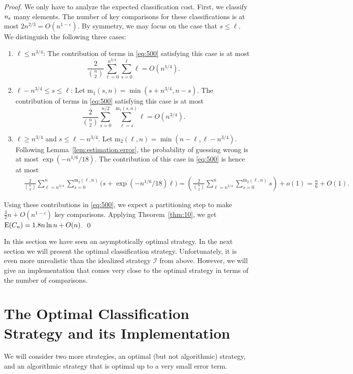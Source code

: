 \documentclass[prodmode,acmtalg]{acmsmall}
\newcommand{\E}{\textnormal{\textrm{E}}}
\newcommand{\Samplesize}{\ensuremath{n_{\textnormal{\textrm{s}}}}}
\begin{document}
\begin{proof}
    We only have to analyze the expected classification cost. First, we classify
    {\Samplesize} many elements. The number of key comparisons for
    these classifications is at most
    $2 n^{2/3} = O(n^{1 - \varepsilon})$. By symmetry, we may focus on the case that $s \leq
    \ell$. We distinguish the following three cases:
    \begin{enumerate}
	\item $\ell \leq n^{3/4}$: The
	    contribution of terms in \eqref{eq:500} satisfying this case is at most
		$$\frac{2}{\binom{n}{2}} \sum_{\ell =
		0}^{n^{3/4}}\sum_{s = 0}^{\ell} \ell = O(n^{1/4}).$$
	\item $\ell - n^{3/4} \leq s \leq \ell$:
            Let $\textrm{m}_1(s, n) = \min(s + n^{3/4}, n - s)$. The contribution
            of terms in \eqref{eq:500} satisfying this case is at most
	     $$\frac{2}{\binom{n}{2}} \sum_{s = 0}^{n/2} \,\, \sum_{\ell
             = s}^{\textrm{m}_1(s, n)} \ell = O(n^{3/4}).$$
     \item $\ell \geq n^{3/4}$ and $s \leq \ell - n^{3/4}$. Let $\textrm{m}_2(\ell, n) =
	 \min(n-\ell, \ell - n^{3/4})$.
	    Following Lemma~\ref{lem:estimation:error}, the probability of
	    guessing wrong is at most $\exp(-n^{1/6}/18)$.
	    The contribution of this case in \eqref{eq:500} is hence at most 
	    \begin{align*}
		&\frac{2}{\binom{n}{2}} \sum_{\ell = n^{3/4}}^{n}\sum_{s =
	    0}^{\textrm{m}_2(\ell, n)} \bigg(s + \exp(-n^{1/6}/18) \ell\bigg) =
	    \left(\frac{2}{\binom{n}{2}} \sum_{\ell = n^{3/4}}^{n}\sum_{s =
	    0}^{\textrm{m}_2(\ell, n)} s\right) + o(1) = \frac{n}{6} + O(1).
	     \end{align*}
    \end{enumerate}
    Using these contributions in \eqref{eq:500}, we
    expect a partitioning step to make $\frac{3}{2}
    n + O(n^{1 - \varepsilon})$ key comparisons. Applying Theorem~\ref{thm:10}, we get
    $\E(C_n) = 1.8 n \ln n + O(n)$. \qed
\end{proof}
In this section we have seen an asymptotically optimal strategy. In the next section we will present the
optimal classification strategy. Unfortunately, it is even more unrealistic than the idealized
strategy $\mathcal{I}$ from above. However, we will give an implementation that comes
very close to the optimal strategy in terms of the number of comparisons. 

\section{The Optimal Classification Strategy and its Implementation}\label{sec:optimal:strategies}
We will consider two more strategies, an optimal (but not algorithmic) strategy, and 
an algorithmic strategy that is optimal up to a very small error term.
\end{document}
